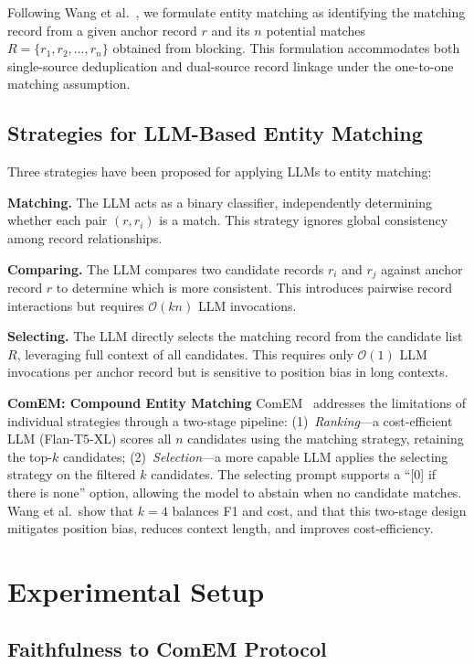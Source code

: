 \documentclass[runningheads]{llncs}
\begin{document}
Following Wang et al.~\cite{wang2025match}, we formulate entity matching as identifying the matching record from a given anchor record $r$ and its $n$ potential matches $R = \{r_1, r_2, \ldots, r_n\}$ obtained from blocking. This formulation accommodates both single-source deduplication and dual-source record linkage under the one-to-one matching assumption.

\subsection{Strategies for LLM-Based Entity Matching}

Three strategies have been proposed for applying LLMs to entity matching:

\textbf{Matching.} The LLM acts as a binary classifier, independently determining whether each pair $(r, r_i)$ is a match. This strategy ignores global consistency among record relationships.

\textbf{Comparing.} The LLM compares two candidate records $r_i$ and $r_j$ against anchor record $r$ to determine which is more consistent. This introduces pairwise record interactions but requires $\mathcal{O}(kn)$ LLM invocations.

\textbf{Selecting.} The LLM directly selects the matching record from the candidate list $R$, leveraging full context of all candidates. This requires only $\mathcal{O}(1)$ LLM invocations per anchor record but is sensitive to position bias in long contexts.

\textbf{ComEM: Compound Entity Matching}
ComEM~\cite{wang2025match} addresses the limitations of individual strategies through a two-stage pipeline: (1)~\emph{Ranking}---a cost-efficient LLM (Flan-T5-XL) scores all $n$ candidates using the matching strategy, retaining the top-$k$ candidates; (2)~\emph{Selection}---a more capable LLM applies the selecting strategy on the filtered $k$ candidates.  The selecting prompt supports a ``[0] if there is none'' option, allowing the model to abstain when no candidate matches. Wang et al.\ show that $k{=}4$ balances F1 and cost, and that this two-stage design mitigates position bias, reduces context length, and improves cost-efficiency.

\section{Experimental Setup}

\subsection{Faithfulness to ComEM Protocol}
\end{document}

